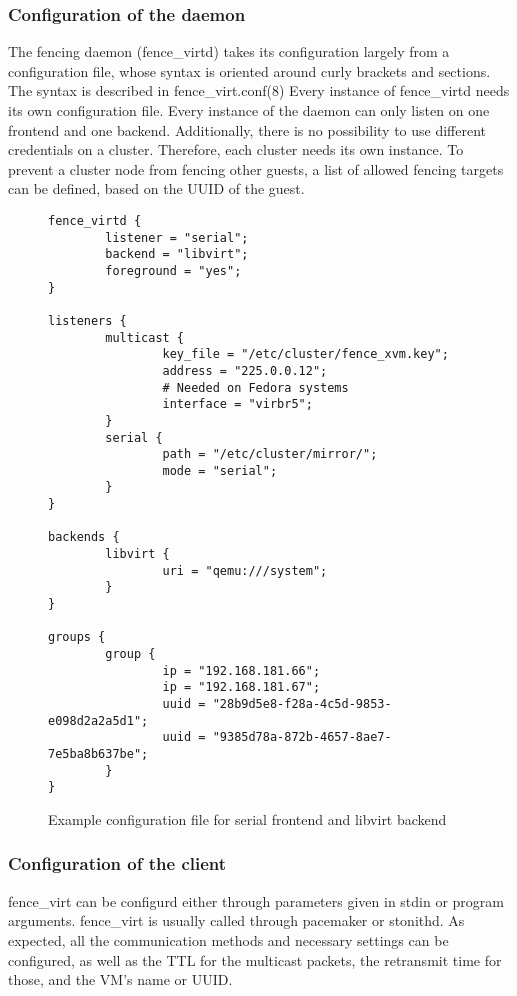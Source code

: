 \subsubsection{Configuration of the daemon}
The fencing daemon (fence\_virtd) takes its configuration largely from
a configuration file, whose syntax is oriented around curly brackets and 
sections. The syntax is described in fence\_virt.conf(8)
Every instance of fence\_virtd needs its own configuration file.
Every instance of the daemon can only listen on one frontend and one backend.
Additionally, there is no possibility to use different credentials on a cluster.
Therefore, each cluster needs its own instance.
To prevent a cluster node from fencing other guests, a list of allowed fencing targets
can be defined, based on the UUID of the guest.
\begin{figure}
\begin{lstlisting}
fence_virtd {
        listener = "serial";
        backend = "libvirt";
        foreground = "yes";
}

listeners {
        multicast {
                key_file = "/etc/cluster/fence_xvm.key";
                address = "225.0.0.12";
                # Needed on Fedora systems
                interface = "virbr5";
        }
        serial {
                path = "/etc/cluster/mirror/";
                mode = "serial";
        }
}

backends {
        libvirt { 
                uri = "qemu:///system";
        }
}

groups {
        group {
                ip = "192.168.181.66";
                ip = "192.168.181.67";
                uuid = "28b9d5e8-f28a-4c5d-9853-e098d2a2a5d1";
                uuid = "9385d78a-872b-4657-8ae7-7e5ba8b637be";
        }
}
\end{lstlisting}
\caption{Example configuration file for serial frontend and libvirt backend}
\end{figure}
\subsubsection{Configuration of the client}
fence\_virt can be configurd either through parameters given in stdin or
program arguments. fence\_virt is usually called through pacemaker or stonithd.
As expected, all the communication methods and necessary settings can be
configured, as well as the \ac{TTL} for the multicast packets, the 
retransmit time for those, and the \ac{VM}'s name or UUID.
